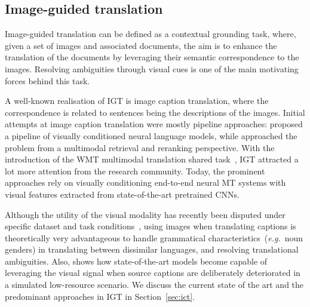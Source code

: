 \documentclass{svjour3}
\newcommand{\eg}[1]{\textit{e.g.}~#1}
\begin{document}
    \subsection{Image-guided translation}
    \label{sec:tasks:ict}
    








        Image-guided translation can be defined as a contextual grounding task,
        where, given a set of images and associated documents, the aim is to enhance the translation of the documents by leveraging their semantic correspondence to the images. Resolving ambiguities through visual cues is one of the main motivating forces behind this task.
        
        A well-known realisation of IGT is image caption translation, where the correspondence is related to sentences being the descriptions of the images.
        Initial attempts at image caption translation were mostly pipeline approaches: \citet{elliott2015multi} proposed a pipeline of visually conditioned neural language models, while \citet{hitschler-2016-multimodal} approached the problem from a multimodal retrieval and reranking perspective. With the introduction of the WMT multimodal translation shared task~\citep[see Section~\ref{sec:eval:tasks:wmt}]{specia-shared-2016}, IGT attracted a lot more attention from the research community. Today, the prominent approaches rely on visually conditioning end-to-end neural MT systems with visual features extracted from state-of-the-art pretrained CNNs.


        Although the utility of the visual modality has recently been disputed under specific dataset and task conditions~\citep{elliott2018adversarial,caglayan-probing-2019}, using images when translating captions is theoretically very advantageous to handle grammatical characteristics~(\eg{noun genders}) in translating between dissimilar languages, and resolving translational ambiguities.
        Also, \citet{caglayan-probing-2019} shows how state-of-the-art models become capable of leveraging the visual signal
        when source captions are deliberately deteriorated in a simulated low-resource scenario. We discuss the current state of the art and the predominant approaches in IGT in Section~\ref{sec:ict}.
        
        
\end{document}
